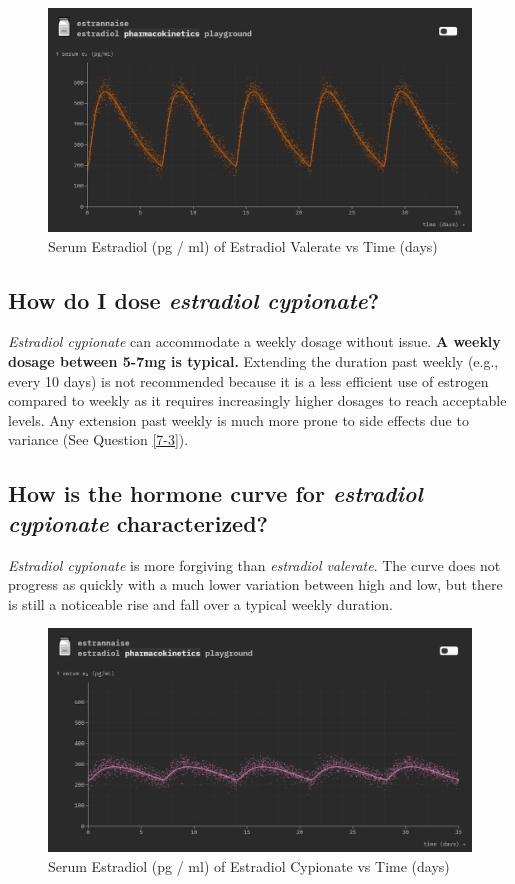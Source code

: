 \documentclass{article}
\begin{document}
 \begin{figure}[H]
     \centering
     \includegraphics[width=1\linewidth]{ev.png}
     \caption{Serum Estradiol (pg / ml) of Estradiol Valerate vs Time (days) }
     \label{fig:ev}
 \end{figure}

\subsection{How do I dose \textit{estradiol cypionate}?}

\textit{Estradiol cypionate} can accommodate a weekly dosage without issue. \textbf{A weekly dosage between 5-7mg is typical.} Extending the duration past weekly (e.g., every 10 days) is not recommended because it is a less efficient use of estrogen compared to weekly as it requires increasingly higher dosages to reach acceptable levels. Any extension past weekly is much more prone to side effects due to variance (See Question \ref{7-3}).

\subsection{How is the hormone curve for \textit{estradiol cypionate} characterized?}

\textit{Estradiol cypionate} is more forgiving than \textit{estradiol valerate}. The curve does not progress as quickly with a much lower variation between high and low, but there is still a noticeable rise and fall over a typical weekly duration.

 \begin{figure}[H]
     \centering
     \includegraphics[width=1\linewidth]{ec.png}
     \caption{Serum Estradiol (pg / ml) of Estradiol Cypionate vs Time (days) }
     \label{fig:ec}
 \end{figure}
\end{document}
